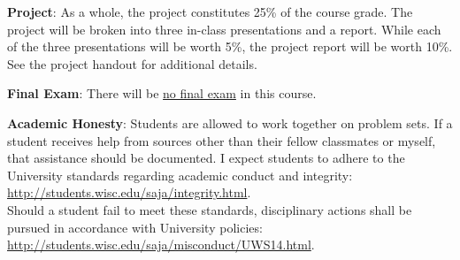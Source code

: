 \textbf{Project}:
As a whole, the project constitutes 25\% of the course grade. The project will be broken into three in-class presentations and a report. While each of the three presentations will be worth 5\%, the project report will be worth 10\%. See the project handout for additional details. 

\textbf{Final Exam}:
There will be \underline{no final exam} in this course.


\textbf{Academic Honesty}:
Students are allowed to work together on problem sets.
If a student receives help from sources other than their fellow classmates or myself, that assistance should be documented.
I expect students to adhere to the University standards regarding academic conduct and integrity:\\
\url{http://students.wisc.edu/saja/integrity.html}.\\
Should a student fail to meet these standards, disciplinary actions shall be pursued in accordance with University policies:\\
\url{http://students.wisc.edu/saja/misconduct/UWS14.html}.


